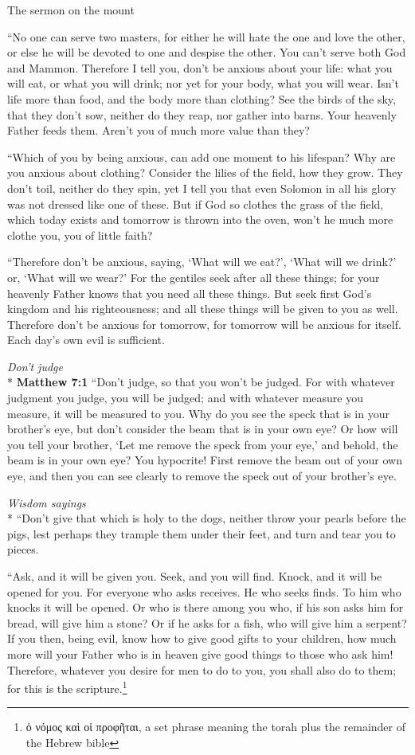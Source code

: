 \documentclass[10pt,a5paper,twoside]{article}
\newcommand{\quotesize}{\normalsize{}}
\newenvironment{quotetext}{\begingroup\quotesize}{\endgroup}
\newcommand{\intex}[1]{\index[texts]{#1}}
\newcommand{\bible}[2]{\begin{quotetext}\textbf{#1}\intex{#1} #2\end{quotetext}}
\newcommand{\matthew}[2]{\bible{Matthew #1}{#2}}
\newcommand{\subhead}[1]{\emph{#1}\\*}
\begin{document}
\begin{section}{The sermon on the mount}
{   ``No one can serve two masters, for either he will hate the one and love the other, or else he will be devoted to one and despise the other. You can't serve both God and Mammon.    Therefore I tell you, don't be anxious about your life: what you will eat, or what you will drink; nor yet for your body, what you will wear. Isn't life more than food, and the body more than clothing?    See the birds of the sky, that they don't sow, neither do they reap, nor gather into barns. Your heavenly Father feeds them. Aren't you of much more value than they?

   ``Which of you by being anxious, can add one moment to his lifespan?    Why are you anxious about clothing? Consider the lilies of the field, how they grow. They don't toil, neither do they spin,    yet I tell you that even Solomon in all his glory was not dressed like one of these.    But if God so clothes the grass of the field, which today exists and tomorrow is thrown into the oven, won't he much more clothe you, you of little faith?

   ``Therefore don't be anxious, saying, `What will we eat?', `What will we drink?' or, `What will we wear?'    For the gentiles seek after all these things; for your heavenly Father knows that you need all these things.    But seek first God's kingdom and his righteousness; and all these things will be given to you as well.    Therefore don't be anxious for tomorrow, for tomorrow will be anxious for itself. Each day's own evil is sufficient. 
}

\subhead{Don't judge}
\matthew{7:1}{
    ``Don't judge, so that you won't be judged.    For with whatever judgment you judge, you will be judged; and with whatever measure you measure, it will be measured to you.    Why do you see the speck that is in your brother's eye, but don't consider the beam that is in your own eye?    Or how will you tell your brother, `Let me remove the speck from your eye,' and behold, the beam is in your own eye?    You hypocrite! First remove the beam out of your own eye, and then you can see clearly to remove the speck out of your brother's eye.

\subhead{Wisdom sayings}
   ``Don't give that which is holy to the dogs, neither throw your pearls before the pigs,\label{pearls-before-swine}
 lest perhaps they trample them under their feet, and turn and tear you to pieces.

   ``Ask, and it will be given you. Seek, and you will find. Knock, and it will be opened for you.    For everyone who asks receives. He who seeks finds. To him who knocks it will be opened.    Or who is there among you who, if his son asks him for bread, will give him a stone?    Or if he asks for a fish, who will give him a serpent?    If you then, being evil, know how to give good gifts to your children, how much more will your Father who is in heaven give good things to those who ask him!    Therefore, whatever you desire for men to do to you, you shall also do to them; for this is 
the scripture.\footnote{ὁ νόμος καὶ οἱ προφῆται, a set phrase meaning the torah plus the remainder of the Hebrew bible}

}
\end{section}
\end{document}
